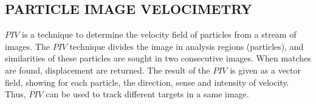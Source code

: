 
\subsection{PARTICLE IMAGE VELOCIMETRY}

$PIV$ is a technique to determine the  velocity field of particles from a stream of images\cite{Bastiaans}.
The $PIV$ technique divides the image in analysis regions (particles), 
and similarities of these particles are sought in two consecutive images.
When matches are found, displacement are returned.
The result of the $PIV$ is given as a vector field, showing for each particle, the direction, sense and intensity of velocity. 
Thus, $PIV$ can be used to track different targets in a same image.
